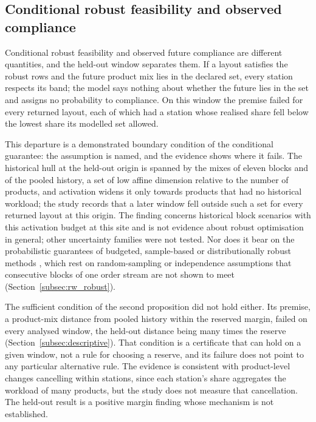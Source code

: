 \subsection{Conditional robust feasibility and observed compliance}\label{subsec:feasibility}
Conditional robust feasibility and observed future compliance are different quantities, and the held-out window separates them. If a layout satisfies the robust rows and the future product mix lies in the declared set, every station respects its band; the model says nothing about whether the future lies in the set and assigns no probability to compliance. On this window the premise failed for every returned layout, each of which had a station whose realised share fell below the lowest share its modelled set allowed.

This departure is a demonstrated boundary condition of the conditional guarantee: the assumption is named, and the evidence shows where it fails. The historical hull at the held-out origin is spanned by the mixes of eleven blocks and of the pooled history, a set of low affine dimension relative to the number of products, and activation widens it only towards products that had no historical workload; the study records that a later window fell outside such a set for every returned layout at this origin. The finding concerns historical block scenarios with this activation budget at this site and is not evidence about robust optimisation in general; other uncertainty families were not tested. Nor does it bear on the probabilistic guarantees of budgeted, sample-based or distributionally robust methods \citep{bertsimas2004price,luedtke2008sample,vanparys2021data}, which rest on random-sampling or independence assumptions that consecutive blocks of one order stream are not shown to meet (Section~\ref{subsec:rw_robust}).

The sufficient condition of the second proposition did not hold either. Its premise, a product-mix distance from pooled history within the reserved margin, failed on every analysed window, the held-out distance being many times the reserve (Section~\ref{subsec:descriptive}). That condition is a certificate that can hold on a given window, not a rule for choosing a reserve, and its failure does not point to any particular alternative rule. The evidence is consistent with product-level changes cancelling within stations, since each station's share aggregates the workload of many products, but the study does not measure that cancellation. The held-out result is a positive margin finding whose mechanism is not established.

